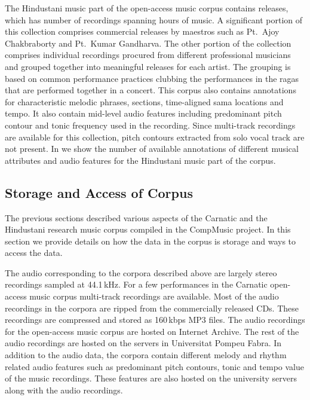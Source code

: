 The Hindustani music part of the open-access music corpus contains  releases, which has  number of recordings spanning  hours of music. A significant portion of this collection comprises commercial releases by maestros such as Pt.~Ajoy Chakbraborty and Pt.~Kumar Gandharva. The other portion of the collection comprises individual recordings procured from different professional musicians and grouped together into meaningful releases for each artist. The grouping is based on common performance practices clubbing the performances in the \glspl{raga} that are performed together in a concert. This corpus also contains annotations for characteristic melodic phrases, sections, time-aligned sama locations and tempo. It also contain mid-level audio features including predominant pitch contour and tonic frequency used in the recording. Since multi-track recordings are available for this collection, pitch contours extracted from solo vocal track are not present. In  we show the number of available annotations of different musical attributes and audio features for the Hindustani music part of the corpus. 



\subsection{Storage and Access of Corpus}
\label{sec:corpus_storage_and_access}

The previous sections described  various aspects of the Carnatic and the Hindustani research music corpus compiled in the CompMusic project. In this section we provide details on how the data in the corpus is storage and ways to access the data.

The audio corresponding to the corpora described above are largely stereo recordings sampled at 44.1\,kHz. For a few performances in the Carnatic open-access music corpus multi-track recordings are available. Most of the audio recordings in the corpora are ripped from the commercially released CDs. These recordings are compressed and stored as 160\,kbps MP3 files. The audio recordings for the open-access music corpus are hosted on Internet Archive. The rest of the audio recordings are hosted on the servers in Universitat Pompeu Fabra. In addition to the audio data, the corpora contain different melody and rhythm related audio features such as predominant pitch contours, tonic and tempo value of the music recordings. These features are also hosted on the university servers along with the audio recordings.

